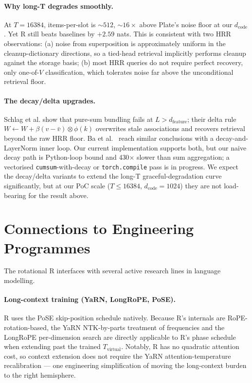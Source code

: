 \documentclass[10pt, twocolumn, a4paper]{article}
\begin{document}
\paragraph{Why long-T degrades smoothly.} At $T=16384$, items-per-slot is $\sim 512$, $\sim 16\times$ above Plate's noise floor at our $d_{\text{code}}$. Yet R still beats baselines by $+2.59$ nats. This is consistent with two HRR observations: (a) noise from superposition is approximately uniform in the cleanup-dictionary directions, so a tied-head retrieval implicitly performs cleanup against the storage basis; (b) most HRR queries do not require perfect recovery, only one-of-$V$ classification, which tolerates noise far above the unconditional retrieval floor.

\paragraph{The decay/delta upgrades.} Schlag et al. \cite{schlag2021lineartransformers} show that pure-sum bundling fails at $L > d_{\text{feature}}$; their delta rule $W \leftarrow W + \beta(v - \bar{v}) \otimes \phi(k)$ overwrites stale associations and recovers retrieval beyond the raw HRR floor. Ba et al.~\cite{ba2016fastweights} reach similar conclusions with a decay-and-LayerNorm inner loop. Our current implementation supports both, but our naive decay path is Python-loop bound and 430$\times$ slower than sum aggregation; a vectorised \texttt{cumsum}-with-decay or \texttt{torch.compile} pass is in progress. We expect the decay/delta variants to extend the long-T graceful-degradation curve significantly, but at our PoC scale ($T \le 16384$, $d_{\text{code}}=1024$) they are not load-bearing for the result above.


\section{Connections to Engineering Programmes}
\label{sec:connections}

The rotational R interfaces with several active research lines in language modelling.

\paragraph{Long-context training (YaRN, LongRoPE, PoSE).} R uses the PoSE skip-position schedule \cite{zhu2024pose} natively. Because R's internals are RoPE-rotation-based, the YaRN \cite{peng2023yarn} NTK-by-parts treatment of frequencies and the LongRoPE \cite{ding2024longrope} per-dimension search are directly applicable to R's phase schedule when extending past the trained $T_{\text{virtual}}$. Notably, R has no quadratic attention cost, so context extension does not require the YaRN attention-temperature recalibration --- one engineering simplification of moving the long-context burden to the right hemisphere.
\end{document}
